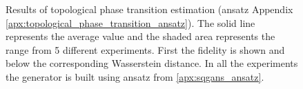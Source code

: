 \begin{figure}[htbp!]

  \caption{Results of topological phase transition estimation (ansatz Appendix \ref{apx:topological_phase_transition_ansatz}).
    The solid line represents the average value and the shaded area
    represents the range from 5 different experiments. First the
    fidelity is shown and below the corresponding Wasserstein distance. In all the
    experiments the generator is built using ansatz from \ref{apx:sqgans_ansatz}.}
  \label{fig:wqgans_phase_res_3}
\end{figure}


